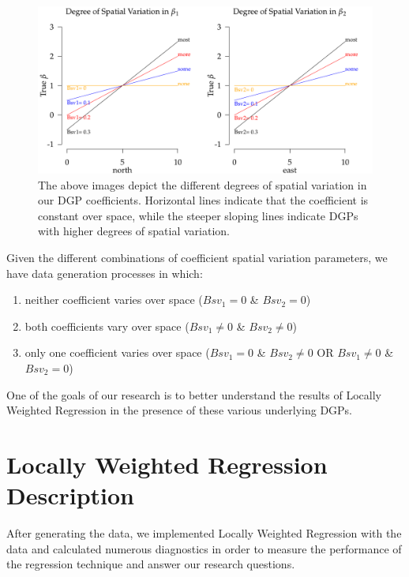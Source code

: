 \documentclass{article}\usepackage{graphicx, color}
\begin{document}
\begin{figure}
\includegraphics[width = \textwidth]{figure/SpatVarBeta.pdf}
\caption{The above images depict the different degrees of spatial variation in our DGP coefficients. Horizontal lines indicate that the coefficient is constant over space, while the steeper sloping lines indicate DGPs with higher degrees of spatial variation.}
\label{fig:SpatVarBeta}
\end{figure}
Given the different combinations of coefficient spatial variation parameters, we have data generation processes in which:
\begin{enumerate}
\item neither coefficient varies over space ($Bsv_1 = 0$ \& $Bsv_2 = 0$)
\item both coefficients vary over space ($Bsv_1 \neq 0$ \& $Bsv_2 \neq 0$)
\item only one coefficient varies over space ($Bsv_1 = 0$ \& $Bsv_2 \neq 0$ OR $Bsv_1 \neq 0$ \& $Bsv_2 = 0$)
\end{enumerate}

One of the goals of our research is to better understand the results of Locally Weighted Regression in the presence of these various underlying DGPs. 


\section{Locally Weighted Regression Description}

After generating the data, we implemented Locally Weighted Regression with the data and calculated numerous diagnostics in order to measure the performance of the regression technique and answer our research questions.
\end{document}
